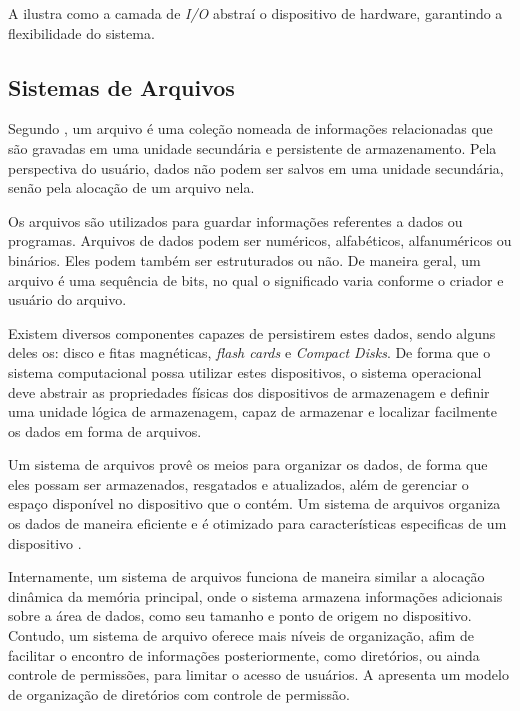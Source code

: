A  ilustra como a camada de \emph{I/O} abstraí o dispositivo de hardware, garantindo a flexibilidade do sistema.


\subsection{Sistemas de Arquivos}

Segundo , um arquivo é uma coleção nomeada de informações relacionadas que são gravadas em uma unidade secundária e persistente de armazenamento. Pela perspectiva do usuário, dados não podem ser salvos em uma unidade secundária, senão pela alocação de um arquivo nela.

Os arquivos são utilizados para guardar informações referentes a dados ou programas. Arquivos de dados podem ser numéricos, alfabéticos, alfanuméricos ou binários. Eles podem também ser estruturados ou não. De maneira geral, um arquivo é uma sequência de bits, no qual o significado varia conforme o criador e usuário do arquivo.

Existem diversos componentes capazes de persistirem estes dados, sendo alguns deles os: disco e fitas magnéticas, \emph{flash cards} e \emph{Compact Disks}. De forma que o sistema computacional possa utilizar estes dispositivos, o sistema operacional deve abstrair as propriedades físicas dos dispositivos de armazenagem e definir uma unidade lógica de armazenagem, capaz de armazenar e localizar facilmente os dados em forma de arquivos.

Um sistema de arquivos provê os meios para organizar os dados, de forma que eles possam ser armazenados, resgatados e atualizados, além de gerenciar o espaço disponível no dispositivo que o contém. Um sistema de arquivos organiza os dados de maneira eficiente e é otimizado para características especificas de um dispositivo \cite{file_system}.

Internamente, um sistema de arquivos funciona de maneira similar a alocação dinâmica da memória principal, onde o sistema armazena informações adicionais sobre a área de dados, como seu tamanho e ponto de origem no dispositivo. Contudo, um sistema de arquivo oferece mais níveis de organização, afim de facilitar o encontro de informações posteriormente, como diretórios, ou ainda controle de permissões, para limitar o acesso de usuários. A  apresenta um modelo de organização de diretórios com controle de permissão.

